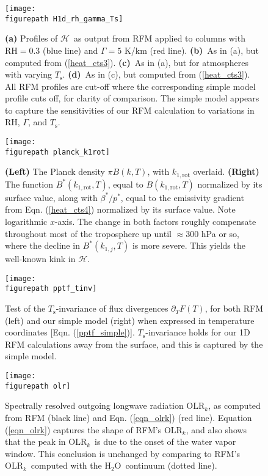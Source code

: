 \documentclass{ametsoc}
\newcommand{\eqnref}[1]{(\ref{#1})}
\newcommand{\ppt}{\ensuremath{\partial_T}}
\newcommand{\Ts}{\ensuremath{T_\mathrm{s}}}
\newcommand{\htwo}{\ensuremath{\mathrm{H_2O}}}
\newcommand{\RH}{\ensuremath{\mathrm{RH}}}
\newcommand{\OLRk}{\ensuremath{\mathrm{OLR}_k}}
\newcommand{\ch}{\ensuremath{\mathcal{H}}}
\newcommand{\konerot}{\ensuremath{k_{1,\mathrm{rot}}}}
\newcommand{\konej}{\ensuremath{k_{1,j}}}
\newcommand{\figurepath}{../plots/}
\begin{document}
\begin{figure}[h]
	\begin{center}
			\texttt{[image: \\figurepath H1d\_rh\_gamma\_Ts]}
		\caption{\textbf{(a)} Profiles of \ch\ as output from RFM applied to columns with $\RH=0.3$ (blue line) and $\Gamma=5$ K/km (red line). 
					\textbf{(b)}\ As in (a), but computed from \eqnref{heat_cts3}. 
					\textbf{(c)}\ As in (a), but for atmospheres with varying \Ts.
					\textbf{(d)}\ As in (c), but computed from \eqnref{heat_cts3}. 
					All RFM profiles are cut-off where the corresponding simple model profile cuts off, for clarity of comparison. The simple model appears to capture the sensitivities of our RFM calculation to variations in \RH, $\Gamma$, and \Ts.
		\label{H1d_rh_gamma_Ts}
		}
	\end{center}
\end{figure}

\begin{figure}[h]
	\begin{center}
			\texttt{[image: \\figurepath planck\_k1rot]}
		\caption{\textbf{(Left)} The Planck density $\pi B(k,T)$, with $\konerot$ overlaid. \textbf{(Right)} The function $B^*(\konerot,T)$, equal to $B(\konerot,T)$ normalized by its surface value, along with $\beta^*/p^*$, equal to the emissivity gradient from Eqn. \eqnref{heat_cts4} normalized by its surface value.  Note logarithmic $x$-axis. The change in both factors roughly compensate throughout most of the troposphere up until $\approx 300$ hPa or so, where the decline in $B^*(\konej,T)$ is more severe. This yields the well-known kink in \ch. 
		\label{planck_k1rot}
		}
	\end{center}
\end{figure}

\begin{figure}[h]
	\begin{center}
			\texttt{[image: \\figurepath pptf\_tinv]}
		\caption{Test of the \Ts-invariance of flux divergences $\ppt F(T)$, for both RFM (left) and our simple model (right) when expressed in temperature coordinates [Eqn. \eqnref{pptf_simple}]. \Ts-invariance holds for our 1D RFM calculations away from the surface, and this is captured by the simple model.
		\label{pptf_tinv}
		}
	\end{center}
\end{figure}

\begin{figure}[h]
	\begin{center}
			\texttt{[image: \\figurepath olr]}
		\caption{Spectrally resolved outgoing longwave radiation \OLRk, as computed from RFM (black line) and Eqn. \eqnref{eqn_olrk} (red line). Equation \eqnref{eqn_olrk} captures the shape of RFM's \OLRk, and also shows that the peak in \OLRk\ is due to the onset of the water vapor window. This conclusion is unchanged by comparing to RFM's \OLRk\ computed with the \htwo\ continuum (dotted line).
		\label{olr}
		}
	\end{center}
\end{figure}
\end{document}
